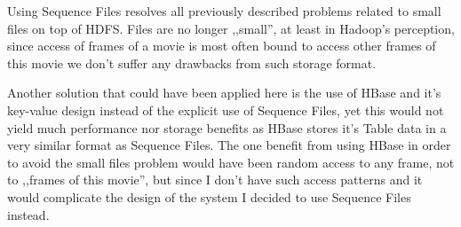 Using Sequence Files resolves all previously described problems related to small files on top of HDFS. Files are no longer ,,small'', at least in Hadoop's perception,
since access of frames of a movie is most often bound to access other frames of this movie we don't suffer any drawbacks from such storage format.

Another solution that could have been applied here is the use of HBase and it's key-value design instead of the explicit use of Sequence Files, yet this would not yield much performance nor storage benefits as HBase stores it's Table data in a very similar format as Sequence Files. The one benefit from using HBase in order to avoid the small files problem would have been random access to any frame, not to ,,frames of this movie'', but since I don't have such access patterns and it would complicate the design of the system I decided to use Sequence Files instead.






